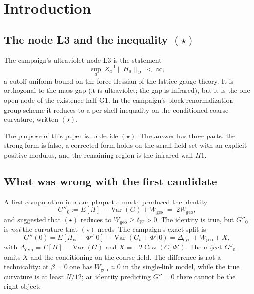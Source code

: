 \documentclass[11pt,a4paper]{article}
\begin{document}
\tableofcontents
\newpage

\section{Introduction}
\label{sec:intro}

\subsection{The node L3 and the inequality $(\star)$}

The campaign's ultraviolet node L3 is the statement
\begin{equation}
\sup_a\ Z_a^{-1}\|H_a\|_{\mathcal D}\ <\ \infty ,
\label{eq:L3}
\end{equation}
a cutoff-uniform bound on the force Hessian of the lattice gauge theory. It is orthogonal to the
mass gap (it is ultraviolet; the gap is infrared), but it is the one open node of the existence half
G1. In the campaign's block renormalization-group scheme it reduces to a per-shell inequality on the
conditioned coarse curvature, written $(\star)$.

The purpose of this paper is to decide $(\star)$. The answer has three parts: the strong form is
false, a corrected form holds on the small-field set with an explicit positive modulus, and the
remaining region is the infrared wall $H1$.

\subsection{What was wrong with the first candidate}

A first computation in a one-plaquette model produced the identity
\begin{equation}
G''_0:=E[H]-\operatorname{Var}(G)+W_{\mathrm{geo}}\;=\;2W_{\mathrm{geo}},
\label{eq:twoW}
\end{equation}
and suggested that $(\star)$ reduces to $W_{\mathrm{geo}}\ge\delta_W>0$. The identity is true, but
$G''_0$ is \emph{not} the curvature that $(\star)$ needs. The campaign's exact split is
\begin{equation}
G''(0)=E[H_{vv}+\Phi''|0]-\operatorname{Var}(G_v+\Phi'|0)
=\Delta_{\mathrm{dyn}}+W_{\mathrm{geo}}+X,
\label{eq:split}
\end{equation}
with $\Delta_{\mathrm{dyn}}=E[H]-\operatorname{Var}(G)$ and
$X=-2\operatorname{Cov}(G,\Phi')$. The object $G''_0$ omits $X$ and the conditioning on the coarse
field. The difference is not a technicality: at $\beta=0$ one has $W_{\mathrm{geo}}\approx0$ in the
single-link model, while the true curvature is at least $N/12$; an identity predicting $G''=0$ there
cannot be the right object.
\end{document}
